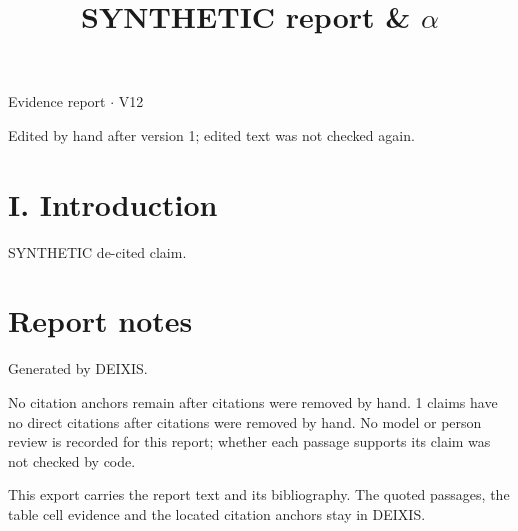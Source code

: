 \documentclass[journal]{IEEEtran}
\begin{document}
\title{SYNTHETIC report \& \ensuremath{\alpha}}

\maketitle

\noindent Evidence report \ensuremath{\cdot} V12

\noindent Edited by hand after version 1; edited text was not checked again.

\section*{I. Introduction}

SYNTHETIC de-cited claim.

\section*{Report notes}

Generated by DEIXIS.

No citation anchors remain after citations were removed by hand. 1 claims have no direct citations after citations were removed by hand. No model or person review is recorded for this report; whether each passage supports its claim was not checked by code.

This export carries the report text and its bibliography. The quoted passages, the table cell evidence and the located citation anchors stay in DEIXIS.
\end{document}
